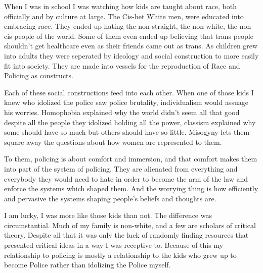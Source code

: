 \documentclass{report}
\begin{document}
When I was in school I was watching how kids are taught
about race, both officially and by culture at large. The
Cis-het White men, were educated into embracing race. They
ended up hating the non-straight, the non-white, the
non-cis people of the world. Some of them even ended up
believing that trans people shouldn't get healthcare even
as their friends came out as trans.
As children grew into adults they were seperated by ideology
and social construction to more easily fit into society.
They are made into vessels for the reproduction of Race
and Policing as constructs.

Each of these social constructions feed into each other.
When one of those kids I knew who idolized the police
saw police brutality, individualism would assuage his worries.
Homophobia explained why the world didn't seem all that good
despite all the people they idolized holding all the power,
classism explained why some should have so much but others
should have so little. Misogyny lets them square away the
questions about how women are represented to them. 

To them, policing is about comfort and immersion, and that 
comfort makes them into part of the system of policing. 
They are alienated from everything and everybody they 
would need to hate in order to become the arm of the law 
and enforce the systems which shaped them. And the worrying 
thing is how efficiently and pervasive the systems shaping 
people's beliefs and thoughts are.

I am lucky, I was more like those kids than not. The difference
was circumstantial.
Much of my family is non-white, and a few are scholars
of critical theory. Despite all that it was only the luck
of randomly finding resources that presented critical
ideas in a way I was receptive to. Because of this my 
relationship to policing is mostly a relationship to the kids 
who grew up to become Police rather than idolizing the Police
myself.
\end{document}
